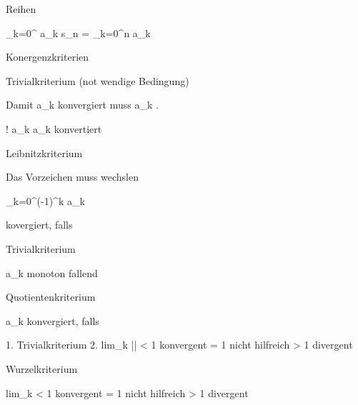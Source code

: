 Reihen

\Sigma_{k=0}^{\infty} a_k
s_n = \Sigma_k=0^n a_k

Konergenzkriterien

Trivialkriterium (not wendige Bedingung)

Damit \Sigma a_k konvergiert muss a_k  .

! a_k  \Rightarrow \Sigma a_k konvertiert

Leibnitzkriterium

Das Vorzeichen muss wechslen

\Sigma_k=0^\infty (-1)^k a_k 

kovergiert, falls

\item Trivialkriterium
\item a_k monoton fallend

Quotientenkriterium

\Soigma a_k konvergiert, falls

1. Trivialkriterium
2. lim_{k } ||
< 1 konvergent
= 1 nicht hilfreich
> 1 divergent

Wurzelkriterium

lim_{k } 
< 1 konvergent
= 1 nicht hilfreich
> 1 divergent

